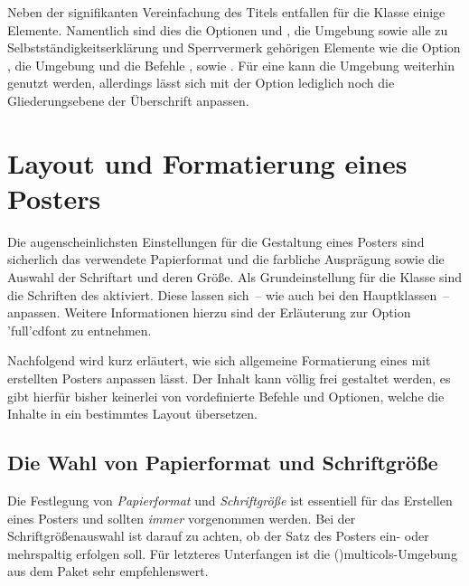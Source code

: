 \begin{DeclareEntity}{}
Neben der signifikanten Vereinfachung des Titels entfallen für die Klasse 
 einige Elemente. Namentlich sind dies die Optionen 
 und , die Umgebung 
 sowie alle zu Selbstständigkeitserklärung und 
Sperrvermerk gehörigen Elemente wie die Option , die 
Umgebung  und die Befehle , 
 sowie . Für eine \abstractname{} 
kann die Umgebung  weiterhin genutzt werden, allerdings 
lässt sich mit der Option  lediglich noch die Gliederungsebene 
der Überschrift anpassen.



\section{Layout und Formatierung eines Posters}

Die augenscheinlichsten Einstellungen für die Gestaltung eines Posters sind 
sicherlich das verwendete Papierformat und die farbliche Ausprägung sowie die 
Auswahl der Schriftart und deren Größe. Als Grundeinstellung für die Klasse
 sind die Schriften des \TUDCDs aktiviert. Diese lassen 
sich~-- wie auch bei den Hauptklassen~-- anpassen. Weitere Informationen hierzu 
sind der Erläuterung zur Option \Option'full'{cdfont} zu entnehmen.

Nachfolgend wird kurz erläutert, wie sich allgemeine Formatierung eines mit 
 erstellten Posters anpassen lässt. Der Inhalt kann völlig 
frei gestaltet werden, es gibt hierfür bisher keinerlei von \TUDScript 
vordefinierte Befehle und Optionen, welche die Inhalte in ein bestimmtes Layout 
übersetzen.



\subsection{%
  Die Wahl von Papierformat und Schriftgröße%
  \label{sec:fontsize}%
}

Die Festlegung von \emph{Papierformat} und \emph{Schriftgröße} ist essentiell 
für das Erstellen eines Posters und sollten \emph{immer} vorgenommen werden. 
Bei der Schriftgrößenauswahl ist darauf zu achten, ob der Satz des Posters 
ein- oder mehrspaltig erfolgen soll. Für letzteres Unterfangen ist die 
\Environment(){multicols}-Umgebung aus dem Paket 
 sehr empfehlenswert. 


\end{DeclareEntity}
